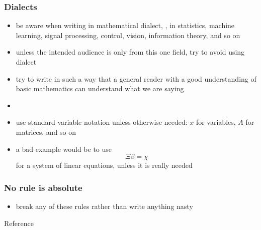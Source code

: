 \documentclass[usepdftitle=false]{beamer}
\begin{document}
\begin{frame}
    \frametitle{Dialects}

    \begin{itemize}\itemsep=12pt
        \item be aware when writing in mathematical dialect, \eg, in statistics, machine learning, signal processing, control, vision, information theory, and so on
        \item unless the intended audience is only from this one field, try to avoid using dialect
        \item try to write in such a way that a general reader with a good understanding of basic mathematics can understand what we are saying
        \item[] 
        \item use standard variable notation unless otherwise needed: $x$ for variables, $A$ for matrices, and so on
        \item a bad example would be to use
            \[
                \Xi \beta = \chi
            \]
            for a system of linear equations, unless it is really needed
    \end{itemize}
\end{frame}

\begin{frame}
    \frametitle{No rule is absolute}

    \begin{itemize}
        \item break any of these rules rather than write anything nasty
    \end{itemize}

\end{frame}

\begin{frame}{Reference}
    
\end{frame}
\end{document}
